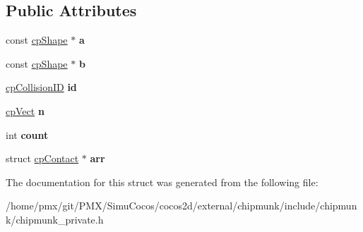 \subsection*{Public Attributes}
\begin{DoxyCompactItemize}
\item 
\mbox{\label{structcpCollisionInfo_a3c25a8598f2de62eff524f57066ca95e}} 
const \hyperlink{structcpShape}{cp\+Shape} $\ast$ {\bfseries a}
\item 
\mbox{\label{structcpCollisionInfo_a28a567040d58ab040e586ecfb96b9267}} 
const \hyperlink{structcpShape}{cp\+Shape} $\ast$ {\bfseries b}
\item 
\mbox{\label{structcpCollisionInfo_ae21c13411c400292c7f3f00e7a73b6c0}} 
\hyperlink{group__basicTypes_ga89d4043ca0567e947aaca19cf9600df5}{cp\+Collision\+ID} {\bfseries id}
\item 
\mbox{\label{structcpCollisionInfo_aa8410869c111353cf2f33467fe4d2769}} 
\hyperlink{structcpVect}{cp\+Vect} {\bfseries n}
\item 
\mbox{\label{structcpCollisionInfo_a3f57f91fb6890a08d00b75522a042153}} 
int {\bfseries count}
\item 
\mbox{\label{structcpCollisionInfo_a48a1efc4d7e31cd600119b012ffc4634}} 
struct \hyperlink{structcpContact}{cp\+Contact} $\ast$ {\bfseries arr}
\end{DoxyCompactItemize}


The documentation for this struct was generated from the following file\+:\begin{DoxyCompactItemize}
\item 
/home/pmx/git/\+P\+M\+X/\+Simu\+Cocos/cocos2d/external/chipmunk/include/chipmunk/chipmunk\+\_\+private.\+h\end{DoxyCompactItemize}
